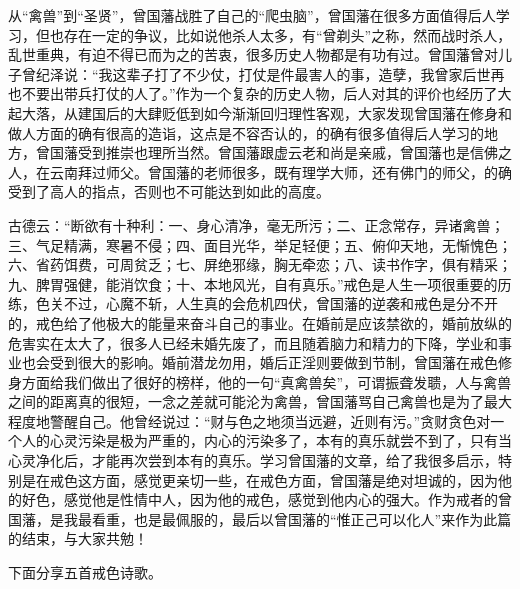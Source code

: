 从“禽兽”到“圣贤”，曾国藩战胜了自己的“爬虫脑”，曾国藩在很多方面值得后人学习，但也存在一定的争议，比如说他杀人太多，有“曾剃头”之称，然而战时杀人，乱世重典，有迫不得已而为之的苦衷，很多历史人物都是有功有过。曾国藩曾对儿子曾纪泽说：“我这辈子打了不少仗，打仗是件最害人的事，造孽，我曾家后世再也不要出带兵打仗的人了。”作为一个复杂的历史人物，后人对其的评价也经历了大起大落，从建国后的大肆贬低到如今渐渐回归理性客观，大家发现曾国藩在修身和做人方面的确有很高的造诣，这点是不容否认的，的确有很多值得后人学习的地方，曾国藩受到推崇也理所当然。曾国藩跟虚云老和尚是亲戚，曾国藩也是信佛之人，在云南拜过师父。曾国藩的老师很多，既有理学大师，还有佛门的师父，的确受到了高人的指点，否则也不可能达到如此的高度。

古德云：“断欲有十种利：一、身心清净，毫无所污；二、正念常存，异诸禽兽；三、气足精满，寒暑不侵；四、面目光华，举足轻便；五、俯仰天地，无惭愧色；六、省药饵费，可周贫乏；七、屏绝邪缘，胸无牵恋；八、读书作字，俱有精采；九、脾胃强健，能消饮食；十、本地风光，自有真乐。”戒色是人生一项很重要的历练，色关不过，心魔不斩，人生真的会危机四伏，曾国藩的逆袭和戒色是分不开的，戒色给了他极大的能量来奋斗自己的事业。在婚前是应该禁欲的，婚前放纵的危害实在太大了，很多人已经未婚先废了，而且随着脑力和精力的下降，学业和事业也会受到很大的影响。婚前潜龙勿用，婚后正淫则要做到节制，曾国藩在戒色修身方面给我们做出了很好的榜样，他的一句“真禽兽矣”，可谓振聋发聩，人与禽兽之间的距离真的很短，一念之差就可能沦为禽兽，曾国藩骂自己禽兽也是为了最大程度地警醒自己。他曾经说过：“财与色之地须当远避，近则有污。”贪财贪色对一个人的心灵污染是极为严重的，内心的污染多了，本有的真乐就尝不到了，只有当心灵净化后，才能再次尝到本有的真乐。学习曾国藩的文章，给了我很多启示，特别是在戒色这方面，感觉更亲切一些，在戒色方面，曾国藩是绝对坦诚的，因为他的好色，感觉他是性情中人，因为他的戒色，感觉到他内心的强大。作为戒者的曾国藩，是我最看重，也是最佩服的，最后以曾国藩的“惟正己可以化人”来作为此篇的结束，与大家共勉！

下面分享五首戒色诗歌。


